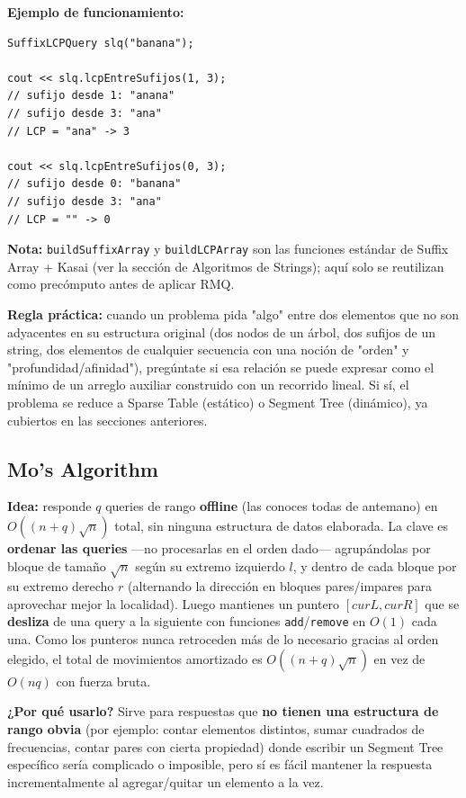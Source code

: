 \documentclass[10pt,a4paper,twocolumn]{article}
\begin{document}
\textbf{Ejemplo de funcionamiento:}

\begin{lstlisting}[style=cpp]
SuffixLCPQuery slq("banana");

cout << slq.lcpEntreSufijos(1, 3);
// sufijo desde 1: "anana"
// sufijo desde 3: "ana"
// LCP = "ana" -> 3

cout << slq.lcpEntreSufijos(0, 3);
// sufijo desde 0: "banana"
// sufijo desde 3: "ana"
// LCP = "" -> 0
\end{lstlisting}

\textbf{Nota:} \texttt{buildSuffixArray} y \texttt{buildLCPArray} son
las funciones estándar de Suffix Array + Kasai (ver la sección de
Algoritmos de Strings); aquí solo se reutilizan como precómputo antes
de aplicar RMQ.

\textbf{Regla práctica:} cuando un problema pida "algo" entre dos
elementos que no son adyacentes en su estructura original (dos nodos
de un árbol, dos sufijos de un string, dos elementos de cualquier
secuencia con una noción de "orden" y "profundidad/afinidad"),
pregúntate si esa relación se puede expresar como el mínimo de un
arreglo auxiliar construido con un recorrido lineal. Si sí, el
problema se reduce a Sparse Table (estático) o Segment Tree
(dinámico), ya cubiertos en las secciones anteriores.


\subsection{Mo's Algorithm}

\textbf{Idea:} responde $q$ queries de rango \textbf{offline} (las
conoces todas de antemano) en $O((n+q)\sqrt n)$ total, sin ninguna
estructura de datos elaborada. La clave es \textbf{ordenar las
queries} —no procesarlas en el orden dado— agrupándolas por bloque de
tamaño $\sqrt n$ según su extremo izquierdo $l$, y dentro de cada
bloque por su extremo derecho $r$ (alternando la dirección en bloques
pares/impares para aprovechar mejor la localidad). Luego mantienes un
puntero $[curL, curR]$ que se \textbf{desliza} de una query a la
siguiente con funciones \texttt{add}/\texttt{remove} en $O(1)$ cada
una. Como los punteros nunca retroceden más de lo necesario gracias al
orden elegido, el total de movimientos amortizado es
$O((n+q)\sqrt n)$ en vez de $O(nq)$ con fuerza bruta.

\textbf{¿Por qué usarlo?} Sirve para respuestas que \textbf{no tienen
una estructura de rango obvia} (por ejemplo: contar elementos
distintos, sumar cuadrados de frecuencias, contar pares con cierta
propiedad) donde escribir un Segment Tree específico sería
complicado o imposible, pero sí es fácil mantener la respuesta
incrementalmente al agregar/quitar un elemento a la vez.
\end{document}
